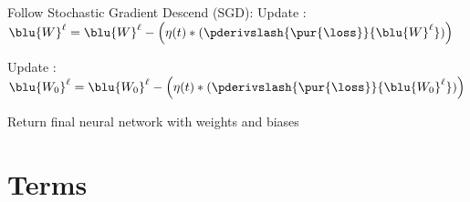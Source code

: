 \begin{codebox}
                                \li Follow Stochastic Gradient Descend (SGD): 
                                    \Do   
                                        \li Update :
                                        \Do
                                            \li $\blu{W}^\ell = \blu{W}^\ell - 
                                            \Big( \eta(t) * (\pderivslash{ \pur{\loss} }{ \blu{W}^{\ell} }) \Big)$
                                        \End
                                        \li
                                        
                                        \li Update :
                                        \Do
                                            \li $\blu{W_0}^{\ell} = \blu{W_0}^{\ell} - 
                                            \Big( \eta(t) * (\pderivslash{ \pur{\loss} }{ \blu{W_0}^{\ell} }) \Big)$
                                        \End
                                        
                                        \li
                                        
                                    \End
                            \End
                        \End

                \End
            \li Return final neural network with weights and biases
    
        \end{codebox}
\pagebreak

\section{Terms}
    
